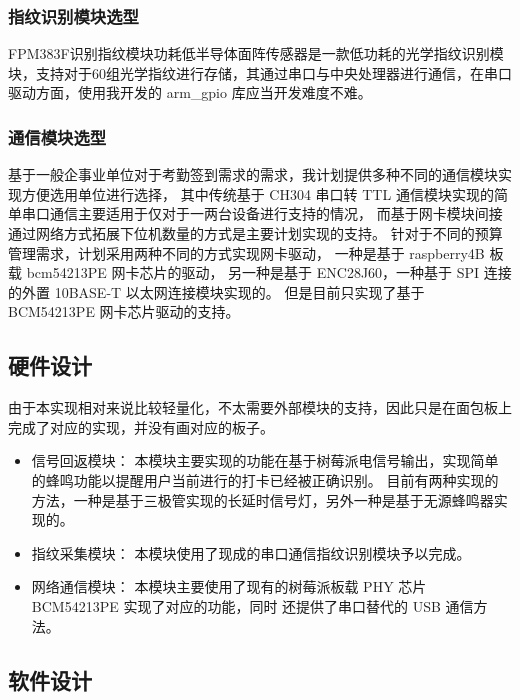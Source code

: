 \subsubsection{指纹识别模块选型}

FPM383F识别指纹模块功耗低半导体面阵传感器是一款低功耗的光学指纹识别模块，支持对于60组光学指纹进行存储，其通过串口与中央处理器进行通信，在串口驱动方面，使用我开发的 arm\_gpio 库应当开发难度不难。

\subsubsection{通信模块选型}

    基于一般企事业单位对于考勤签到需求的需求，我计划提供多种不同的通信模块实现方便选用单位进行选择，
    其中传统基于 CH304 串口转 TTL 通信模块实现的简单串口通信主要适用于仅对于一两台设备进行支持的情况，
    而基于网卡模块间接通过网络方式拓展下位机数量的方式是主要计划实现的支持。
    针对于不同的预算管理需求，计划采用两种不同的方式实现网卡驱动，
    一种是基于 raspberry4B 板载 bcm54213PE 网卡芯片的驱动，
    另一种是基于 ENC28J60，一种基于 SPI 连接的外置 10BASE-T 以太网连接模块实现的。
    但是目前只实现了基于 BCM54213PE 网卡芯片驱动的支持。

\subsection{硬件设计}

    由于本实现相对来说比较轻量化，不太需要外部模块的支持，因此只是在面包板上完成了对应的实现，并没有画对应的板子。

    \begin{itemize}
        \item 信号回返模块：
            本模块主要实现的功能在基于树莓派电信号输出，实现简单的蜂鸣功能以提醒用户当前进行的打卡已经被正确识别。
            目前有两种实现的方法，一种是基于三极管实现的长延时信号灯，另外一种是基于无源蜂鸣器实现的。
        \item 指纹采集模块：
            本模块使用了现成的串口通信指纹识别模块予以完成。
        \item 网络通信模块：
            本模块主要使用了现有的树莓派板载 PHY 芯片 BCM54213PE 实现了对应的功能，同时
            还提供了串口替代的 USB 通信方法。
    \end{itemize}

\subsection{软件设计}

